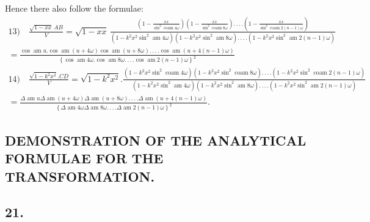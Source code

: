 \documentclass{article}
\begin{document}
Hence there also follow the formulae:
\[
\begin{gathered}
\text{13)}\quad\frac{\sqrt{1-xx}\,AB}{V}=\sqrt{1-xx}\,\frac{\left(1-\frac{xx}{\sin^{2}\operatorname{coam}4\omega}\right)\left(1-\frac{xx}{\sin^{2}\operatorname{coam}8\omega}\right).\,.\,.\,.\left(1-\frac{xx}{\sin^{2}\operatorname{coam}2(n-1)\omega}\right)}{\left(1-k^{2}x^{2}\sin^{2}\operatorname{am}4\omega\right)\left(1-k^{2}x^{2}\sin^{2}\operatorname{am}8\omega\right).\,.\,.\,.\left(1-k^{2}x^{2}\sin^{2}\operatorname{am}2(n-1)\omega\right)}\\[1.5ex]
=\frac{\cos\operatorname{am}u.\cos\operatorname{am}(u+4\omega)\cos\operatorname{am}(u+8\omega).\,.\,.\,.\cos\operatorname{am}(u+4(n-1)\omega)}{\left\{\cos\operatorname{am}4\omega.\cos\operatorname{am}8\omega.\,.\,.\,.\cos\operatorname{am}2(n-1)\omega\right\}^{2}}
\end{gathered}
\]
\[
\begin{gathered}
\text{14)}\quad\frac{\sqrt{1-k^{2}x^{2}}.CD}{V}=\sqrt{1-k^{2}x^{2}}.\frac{\left(1-k^{2}x^{2}\sin^{2}\operatorname{coam}4\omega\right)\left(1-k^{2}x^{2}\sin^{2}\operatorname{coam}8\omega\right).\,.\,.\,.\left(1-k^{2}x^{2}\sin^{2}\operatorname{coam}2(n-1)\omega\right)}{\left(1-k^{2}x^{2}\sin^{2}\operatorname{am}4\omega\right)\left(1-k^{2}x^{2}\sin^{2}\operatorname{am}8\omega\right).\,.\,.\,.\left(1-k^{2}x^{2}\sin^{2}\operatorname{am}2(n-1)\omega\right)}\\[1.5ex]
=\frac{\Delta\operatorname{am}u\Delta\operatorname{am}(u+4\omega)\Delta\operatorname{am}(u+8\omega).\,.\,.\,.\Delta\operatorname{am}(u+4(n-1)\omega)}{\left\{\Delta\operatorname{am}4\omega\Delta\operatorname{am}8\omega.\,.\,.\,.\Delta\operatorname{am}2(n-1)\omega\right\}^{2}}.
\end{gathered}
\]

\subsection*{DEMONSTRATION OF THE ANALYTICAL FORMULAE FOR THE TRANSFORMATION.}

\subsection*{21.}
\end{document}
